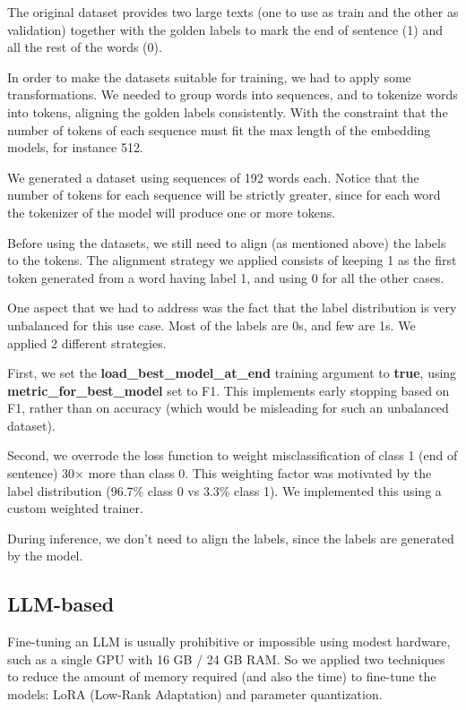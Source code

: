 \documentclass[11pt]{article}
\begin{document}
The original dataset provides two large texts (one to use as train and the other as validation) together with the golden labels to mark the end of sentence (1) and all the rest of the words (0).

In order to make the datasets suitable for training, we had to apply some transformations. 
We needed to group words into sequences, and to tokenize words into tokens, aligning the golden labels consistently.
With the constraint that the number of tokens of each sequence must fit the max length of the embedding models,
for instance 512.

We generated a dataset using sequences of 192 words each. Notice that the number of tokens for each sequence will be strictly greater,
since for each word the tokenizer of the model will produce one or more tokens.

Before using the datasets, we still need to align (as mentioned above) the labels to the tokens.
The alignment strategy we applied consists of keeping 1 as the first token generated from a word
having label 1, and using 0 for all the other cases.

One aspect that we had to address was the fact that the label distribution is very unbalanced
for this use case. Most of the labels are 0s, and few are 1s. We applied 2 different strategies.

First, we set the \textbf{load\_best\_model\_at\_end} training argument to \textbf{true},
using \textbf{metric\_for\_best\_model} set to F1. This implements early stopping based on F1,
rather than on accuracy (which would be misleading for such an unbalanced dataset).

Second, we overrode the loss function to weight misclassification of class 1 (end of sentence) 30× more than class 0. 
This weighting factor was motivated by the label distribution (96.7\% class 0 vs 3.3\% class 1). 
We implemented this using a custom weighted trainer. 

During inference, we don't need to align the labels, since the labels are generated by the model.

\subsection{LLM-based}

Fine-tuning an LLM is usually prohibitive or impossible using modest hardware, such as a single GPU with 16 GB / 24 GB RAM. So we applied two techniques to reduce the amount of memory required (and also the time) to fine-tune the models: LoRA (Low-Rank Adaptation) and parameter quantization.
\end{document}
